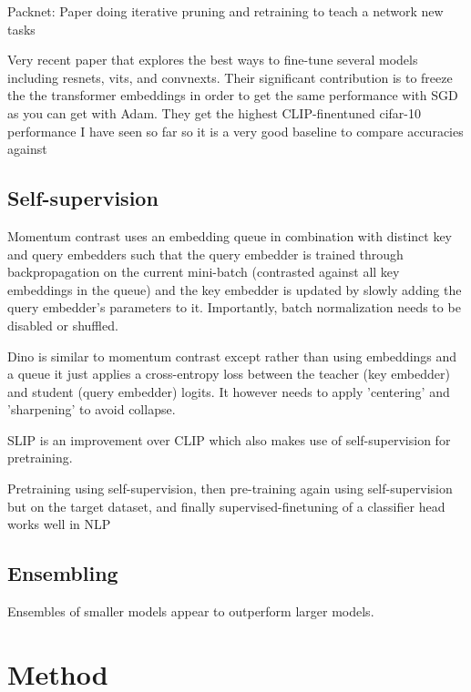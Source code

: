 \documentclass[12pt]{report}
\begin{document}
    Packnet: Paper doing iterative pruning and retraining to teach a network new tasks ~\cite{mallyaPackNetAddingMultiple2018}

    Very recent paper that explores the best ways to fine-tune several models including resnets, vits, and convnexts.
    Their significant contribution is to freeze the the transformer embeddings in order to get the same performance with SGD as you can get with Adam. They get the highest CLIP-finentuned cifar-10 performance I have seen so far so it is a very good baseline to compare accuracies against~\cite{kumarHowFineTuneVision2022}



    \section{Self-supervision}

    Momentum contrast uses an embedding queue in combination with distinct key and query embedders such that the query embedder is trained through backpropagation on the current mini-batch (contrasted against all key embeddings in the queue) and the key embedder is updated by slowly adding the query embedder's parameters to it. Importantly, batch normalization needs to be disabled or shuffled.~\cite{heMomentumContrastUnsupervised2020}

    Dino is similar to momentum contrast except rather than using embeddings and a queue it just applies a cross-entropy loss between the teacher (key embedder) and student (query embedder) logits. It however needs to apply 'centering' and 'sharpening' to avoid collapse.~\cite{caronEmergingPropertiesSelfSupervised2021a}

    SLIP is an improvement over CLIP which also makes use of self-supervision for pretraining.~\cite{muSLIPSelfsupervisionMeets2021}

    Pretraining using self-supervision, then pre-training again using self-supervision but on the target dataset, and finally supervised-finetuning of a classifier head works well in NLP~\cite{gururanganDonStopPretraining2020, howardUniversalLanguageModel2018}

    \section{Ensembling}
    Ensembles of smaller models appear to outperform larger models.~\cite{kondratyukWhenEnsemblingSmaller2020}

    \chapter{Method}
\end{document}
